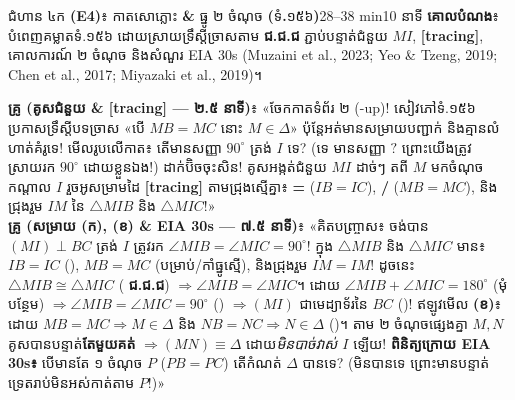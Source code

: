 \documentclass[a4paper,12pt]{article}
\newcommand{\en}[1]{{\TimesEn #1}}
\newcommand{\enbf}[1]{{\TimesEn\textbf{#1}}}
\newcommand{\cnum}[1]{{\TimesEn\fontsize{10.5pt}{12pt}\selectfont\ding{\numexpr181+#1\relax}}}
\newcommand{\tri}[1]{\ensuremath{\triangle #1}}
\newcommand{\ang}[1]{\ensuremath{\angle #1}}
\newcommand{\cg}{\ensuremath{\cong}}
\begin{document}
\Needspace{2.0cm}
\begin{phasebox}{ជំហាន ៤ក \enbf{(E4)}៖ កាតសោភ្លោះ \enbf{\&} ធ្នូ ២ ចំណុច \enbf{(}ទំ\enbf{.}១៥៦\enbf{)}}{28--38 min}{10 នាទី}
\textbf{គោលបំណង}៖ បំពេញគម្លាតទំ.១៥៦ ដោយស្រាយទ្រឹស្ដីច្រាសតាម \textbf{ជ.ជ.ជ} ភ្ជាប់បន្ទាត់ជំនួយ $MI$, \en{\textbf{[tracing]}}, គោលការណ៍ ២ ចំណុច និងសំណួរ \en{EIA 30s} \en{(Muzaini et al., 2023; Yeo \& Tzeng, 2019; Chen et al., 2017; Miyazaki et al., 2019)}។
\end{phasebox}
\begin{scriptbox}
  \textbf{គ្រូ (គូសជំនួយ \en{\& [tracing]} — ២.៥ នាទី)}៖ «ចែកកាតទំព័រ ២ (\en{2-up})! សៀវភៅទំ.១៥៦ ប្រកាសទ្រឹស្ដីបទច្រាស «បើ $MB=MC$ នោះ $M\in\Delta$» ប៉ុន្តែអត់មានសម្រាយបញ្ជាក់ និងគ្មានលំហាត់គំរូទេ! មើលរូបលើកាត៖ តើមានសញ្ញា $90^\circ$ ត្រង់ $I$ ទេ? (ទេ មានសញ្ញា $?$ ព្រោះយើងត្រូវស្រាយរក $90^\circ$ ដោយខ្លួនឯង!) ដាក់ប៊ិចចុះសិន! គូសអង្កត់ជំនួយ $MI$ ដាច់ៗ តពី $M$ មកចំណុចកណ្ដាល $I$ រួចអូសម្រាមដៃ \en{\textbf{[tracing]}} តាមជ្រុងស្មើគ្នា៖ \enbf{=} ($IB=IC$), \enbf{/} ($MB=MC$), និងជ្រុងរួម $IM$ នៃ $\tri{MIB}$ និង $\tri{MIC}$!»\\[2pt]
  \textbf{គ្រូ (សម្រាយ (ក), (ខ) \& \en{EIA 30s} — ៧.៥ នាទី)}៖ «គិតបញ្ច្រាស៖ ចង់បាន $(MI)\perp BC$ ត្រង់ $I$ ត្រូវរក $\ang{MIB}=\ang{MIC}=90^\circ$! ក្នុង $\tri{MIB}$ និង $\tri{MIC}$ មាន៖ $IB=IC$ (\cnum{1}), $MB=MC$ (បម្រាប់/កាំធ្នូស្មើ), និងជ្រុងរួម $IM=IM$! ដូចនេះ $\tri{MIB}\cg\tri{MIC}$ (\cnum{3} \textbf{ជ.ជ.ជ}) $\Rightarrow \ang{MIB}=\ang{MIC}$។ ដោយ $\ang{MIB}+\ang{MIC}=180^\circ$ (មុំបន្ថែម) $\Rightarrow \ang{MIB}=\ang{MIC}=90^\circ$ (\cnum{2}) $\Rightarrow (MI)$ ជាមេដ្យាទ័រនៃ $BC$ (\cnum{5})! ឥឡូវមើល \textbf{(ខ)}៖ ដោយ $MB=MC \Rightarrow M\in\Delta$ និង $NB=NC \Rightarrow N\in\Delta$ (\cnum{5})។ តាម ២ ចំណុចផ្សេងគ្នា $M, N$ គូសបានបន្ទាត់\textbf{តែមួយគត់} $\Rightarrow (MN)\equiv\Delta$ ដោយ\emph{មិនបាច់វាស់ $I$} ឡើយ! \textbf{ពិនិត្យក្រោយ \en{EIA 30s}៖} បើមានតែ ១ ចំណុច $P$ ($PB=PC$) តើកំណត់ $\Delta$ បានទេ? (មិនបានទេ ព្រោះមានបន្ទាត់ទ្រេតរាប់មិនអស់កាត់តាម $P$!)»
\end{scriptbox}
\end{document}
